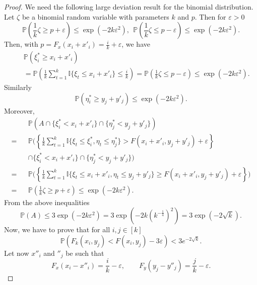 \documentclass[10pt,a4paper]{amsart}
\def\I{{\mathbb {I}}}                       \def\M{{\mathbb {M}}}
\def\P{{\mathbb {P}}}                       \def\Q{{\mathbb {Q}}}
\begin{document}
\begin{proof}
We need the following large deviation result for the binomial distribution.
Let $\zeta$ be a binomial random variable with parameters $k$ and $p$.
Then for $\varepsilon>0$
\begin{equation} \label{H44}
\P\left(\frac{1}{k} \zeta \ge p+\varepsilon \right)
\le \exp (-2k \varepsilon^2 ), \ \
\P\left(\frac{1}{k} \zeta \le p-\varepsilon \right)
\le \exp (-2k \varepsilon^2 ) .
\end{equation}
Then, with $p= F_x(x_i+ x'_i) = \frac{i}{k }  + \varepsilon$, we have
\begin{eqnarray*}
&&\P\left(\xi^\ast_i \ge  x_i+ x'_i  \right) \\
&&=\P \left( \frac{1}{k} \sum_{t=1}^k \I\{ \xi_t \le x_i+ x'_i\}  \le \frac{i}{k} \right)
= \P\left(\frac{1}{k} \zeta \le p-\varepsilon \right)
\le \exp (-2k \varepsilon^2 ) .
\end{eqnarray*}
Similarly 
$$
\P\left(\eta^\ast_i \ge  y_j+ y'_j  \right) 
\le \exp (-2k \varepsilon^2 ) .
$$
%
Moreover,
\begin{eqnarray*} 
&& \P\left(A \cap \{ \xi^\ast_i <  x_i+ x'_i \} \cap \{ \eta^\ast_j <  y_j+ y'_j \} \right)  \\
 = &&
\P \Bigg( \left\{ \frac{1}{k} \sum\nolimits_{t=1}^k \I\{ \xi_t \le \xi_i^\ast, \eta_t \le \eta_j^\ast \} 
> F(x_i+ x'_i, y_j+y'_j) +\varepsilon  \right\}     \\
&& \cap \{ \xi^\ast_i <  x_i+ x'_i  \} \cap \{ \eta^\ast_j <  y_j+ y'_j  \} \Bigg)  \\
=&&
\P \Bigg( \left\{ \frac{1}{k} \sum\nolimits_{t=1}^k 
\I\{ \xi_t \le x_i+ x'_i, \eta_t \le y_j+ y'_j \} 
\ge  F(x_i+ x'_i, y_j+y'_j) +\varepsilon  \right\}  \Bigg)   \\
= &&  \P\left(\frac{1}{k} \zeta \ge p+\varepsilon \right)
\le \exp (-2k \varepsilon^2 ) .
\end{eqnarray*}
From the above inequalities
$$
\P(A) \le 3 \exp (-2k \varepsilon^2 ) = 3 \exp (-2k (k^{-\frac{1}{4}})^2 ) = 3 \exp (-2\sqrt{k}).
$$
%
Now, we have to prove that for all $i,j\in [k]$
\begin{equation} \label{H41+}
\P \left( F_k(x_i,y_j) < F(x_i,y_j) -3\varepsilon   \right)
< 3 e^{-2\sqrt{k}} .
\end{equation} 
Let now
$x''_i$ and $''_j$ be such that
\begin{equation*}
F_x(x_i- x''_i) = \frac{i}{k }  - \varepsilon, \qquad  F_y(y_j- y''_j) = \frac{j}{k }  - \varepsilon .
\end{equation*} 

\end{proof}
\end{document}
